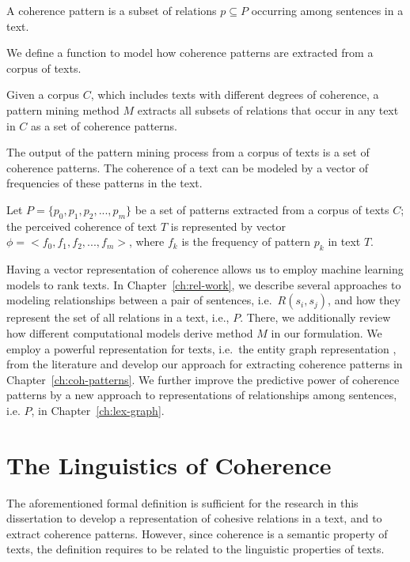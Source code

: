 \begin{definition}
\label{def:def-coh-pattern}
A coherence pattern is a subset of relations $p \subseteq P$ occurring among sentences in a text.   
\end{definition}

We define a function to model how coherence patterns are extracted from a corpus of texts. 

\begin{definition}
Given a corpus $C$, which includes texts with different degrees of coherence, a pattern mining method $M$ extracts all subsets of relations that occur in any text in $C$ as a set of coherence patterns. 
\end{definition} 

The output of the pattern mining process from a corpus of texts is a set of coherence patterns. 
The coherence of a text can be modeled by a vector of frequencies of these patterns in the text. 

\begin{definition}
Let $P=\lbrace p_0,p_1,p_2,...,p_m \rbrace$ be a set of patterns extracted from a corpus of texts $C$; the perceived coherence of text $T$ is represented by  vector $\phi = <f_0, f_1, f_2,...,f_m>$, where $f_k$ is the frequency of pattern $p_k$ in text $T$. 
\end{definition}

Having a vector representation of coherence allows us to employ machine learning models to rank texts. 
In Chapter~\ref{ch:rel-work}, we describe several approaches to modeling relationships between a pair of sentences, i.e.\ $R(s_i,s_j)$, and how they represent the set of all relations in a text, i.e., $P$.  
There, we additionally review how different computational models derive method $M$ in our formulation.  
We employ a powerful representation for texts, i.e.\ the entity graph representation \cite{guinaudeau13}, from the literature and develop our approach for extracting coherence patterns in Chapter~\ref{ch:coh-patterns}. 
We further improve the predictive power of coherence patterns by a new approach to representations of relationships among sentences, i.e. $P$, in Chapter~\ref{ch:lex-graph}. 

\section{The Linguistics of Coherence}
\label{sec:coh-linguistics}

The aforementioned formal definition is sufficient for the research in this dissertation to develop a representation of cohesive relations in a text, and to extract coherence patterns. 
However, since coherence is a semantic property of texts, the definition requires to be related to the linguistic properties of texts. 

